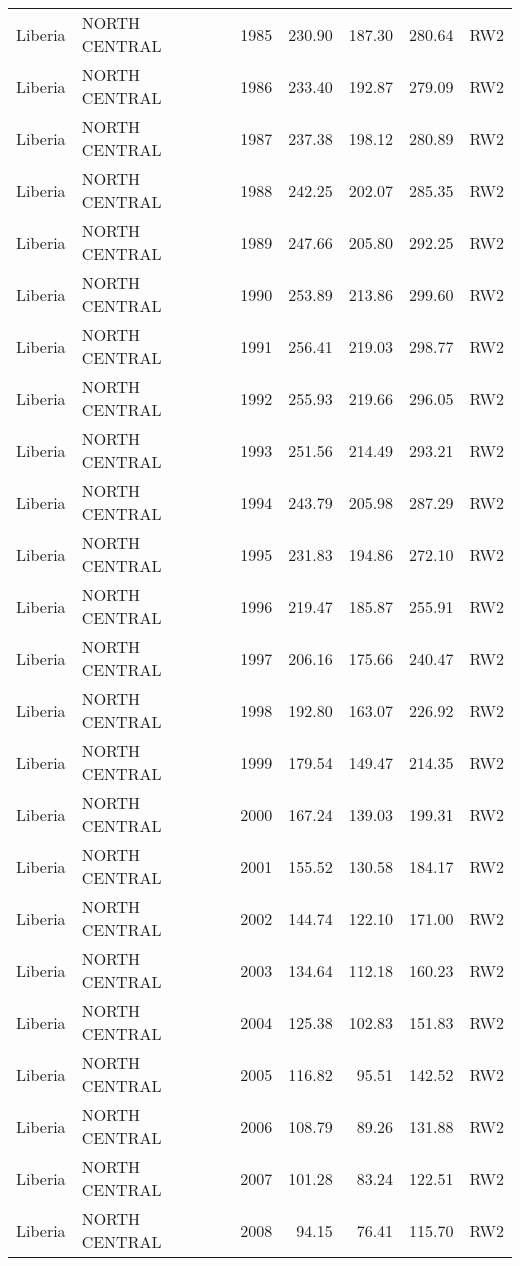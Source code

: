 \begin{longtable}{lllrrrl}
  Liberia & NORTH CENTRAL & 1985 & 230.90 & 187.30 & 280.64 & RW2 \\ 
  Liberia & NORTH CENTRAL & 1986 & 233.40 & 192.87 & 279.09 & RW2 \\ 
  Liberia & NORTH CENTRAL & 1987 & 237.38 & 198.12 & 280.89 & RW2 \\ 
  Liberia & NORTH CENTRAL & 1988 & 242.25 & 202.07 & 285.35 & RW2 \\ 
  Liberia & NORTH CENTRAL & 1989 & 247.66 & 205.80 & 292.25 & RW2 \\ 
  Liberia & NORTH CENTRAL & 1990 & 253.89 & 213.86 & 299.60 & RW2 \\ 
  Liberia & NORTH CENTRAL & 1991 & 256.41 & 219.03 & 298.77 & RW2 \\ 
  Liberia & NORTH CENTRAL & 1992 & 255.93 & 219.66 & 296.05 & RW2 \\ 
  Liberia & NORTH CENTRAL & 1993 & 251.56 & 214.49 & 293.21 & RW2 \\ 
  Liberia & NORTH CENTRAL & 1994 & 243.79 & 205.98 & 287.29 & RW2 \\ 
  Liberia & NORTH CENTRAL & 1995 & 231.83 & 194.86 & 272.10 & RW2 \\ 
  Liberia & NORTH CENTRAL & 1996 & 219.47 & 185.87 & 255.91 & RW2 \\ 
  Liberia & NORTH CENTRAL & 1997 & 206.16 & 175.66 & 240.47 & RW2 \\ 
  Liberia & NORTH CENTRAL & 1998 & 192.80 & 163.07 & 226.92 & RW2 \\ 
  Liberia & NORTH CENTRAL & 1999 & 179.54 & 149.47 & 214.35 & RW2 \\ 
  Liberia & NORTH CENTRAL & 2000 & 167.24 & 139.03 & 199.31 & RW2 \\ 
  Liberia & NORTH CENTRAL & 2001 & 155.52 & 130.58 & 184.17 & RW2 \\ 
  Liberia & NORTH CENTRAL & 2002 & 144.74 & 122.10 & 171.00 & RW2 \\ 
  Liberia & NORTH CENTRAL & 2003 & 134.64 & 112.18 & 160.23 & RW2 \\ 
  Liberia & NORTH CENTRAL & 2004 & 125.38 & 102.83 & 151.83 & RW2 \\ 
  Liberia & NORTH CENTRAL & 2005 & 116.82 & 95.51 & 142.52 & RW2 \\ 
  Liberia & NORTH CENTRAL & 2006 & 108.79 & 89.26 & 131.88 & RW2 \\ 
  Liberia & NORTH CENTRAL & 2007 & 101.28 & 83.24 & 122.51 & RW2 \\ 
  Liberia & NORTH CENTRAL & 2008 & 94.15 & 76.41 & 115.70 & RW2 \\ 

\end{longtable}
